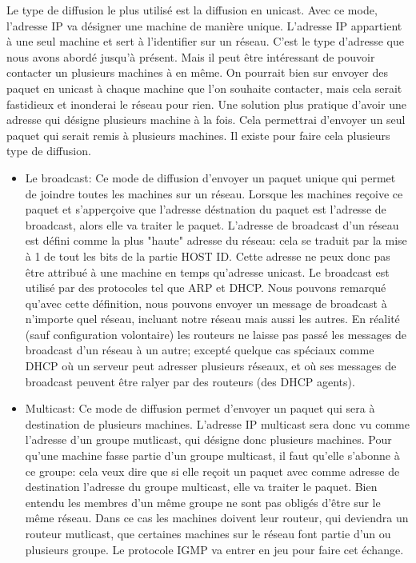 Le type de diffusion le plus utilisé est la diffusion en unicast. Avec ce mode,
l'adresse IP va désigner une machine de manière unique. L'adresse IP appartient
à une seul machine et sert à l'identifier sur un réseau.  C'est le type
d'adresse que nous avons abordé jusqu'à présent.  Mais il peut être intéressant
de pouvoir contacter un plusieurs machines à en même. On pourrait bien sur
envoyer des paquet en unicast à chaque machine que l'on souhaite contacter,
mais cela serait fastidieux et inonderai le réseau pour rien. Une solution plus
pratique d'avoir une adresse qui désigne plusieurs machine à la fois. Cela
permettrai d'envoyer un seul paquet qui serait remis à plusieurs machines. Il
existe pour faire cela plusieurs type de diffusion.
\begin{itemize}
\item Le broadcast: Ce mode de diffusion d'envoyer un paquet unique qui permet
de joindre toutes les machines sur un réseau. Lorsque les machines reçoive ce
paquet et s'apperçoive que l'adresse déstnation du paquet est l'adresse de
broadcast, alors elle va traiter le paquet. L'adresse de broadcast d'un réseau
est défini comme la plus "haute" adresse du réseau: cela se traduit par la mise
à 1 de tout les bits de la partie HOST ID. Cette adresse ne peux donc pas être
attribué à une machine en temps qu'adresse unicast.  Le broadcast est utilisé
par des protocoles tel que ARP et DHCP.  Nous pouvons remarqué qu'avec cette
définition, nous pouvons envoyer un message de broadcast à n'importe quel
réseau, incluant notre réseau mais aussi les autres. En réalité (sauf
configuration volontaire) les routeurs ne laisse pas passé les messages de
broadcast d'un réseau à un autre; excepté quelque cas spéciaux comme DHCP où un
serveur peut adresser plusieurs réseaux, et où ses messages de broadcast
peuvent être ralyer par des routeurs (des DHCP agents).
\item Multicast: Ce mode de diffusion permet d'envoyer un paquet qui sera à destination
de plusieurs machines. L'adresse IP multicast sera donc vu comme l'adresse d'un groupe
mutlicast, qui désigne donc plusieurs machines. Pour qu'une machine fasse partie d'un
groupe multicast, il faut qu'elle s'abonne à ce groupe: cela veux dire que si elle reçoit
un paquet avec comme adresse de destination l'adresse du groupe multicast, elle va traiter
le paquet.
Bien entendu les membres d'un même groupe ne sont pas obligés d'être sur le même réseau. Dans ce
cas les machines doivent leur routeur, qui deviendra un routeur mutlicast, que certaines machines sur
le réseau font partie d'un ou plusieurs groupe. Le protocole IGMP va entrer en jeu pour faire cet échange.

\end{itemize}
